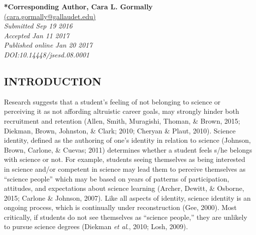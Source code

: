 \documentclass[11.5pt]{sig-alternate} %
\begin{document}
\textbf{*Corresponding Author, Cara L. Gormally}\\
\href{mailto: cara.gormally@gallaudet.edu }{(cara.gormally@gallaudet.edu)} \\
\textit{Submitted Sep 19 2016 }\\
\textit{Accepted Jan 11 2017} \\
\textit{Published online Jan 20 2017} \\
\textit{DOI:10.14448/jsesd.08.0001} \\
\pagebreak
\clearpage
\begin{large}
\section*{INTRODUCTION}

Research suggests that a student’s feeling of not belonging to science or perceiving it as not affording altruistic career goals, may strongly hinder both recruitment and retention (Allen, Smith, Muragishi, Thoman, \& Brown, 2015; Diekman, Brown, Johnston, \& Clark; 2010; Cheryan \& Plaut, 2010). Science identity, defined as the authoring of one’s identity in relation to science (Johnson, Brown, Carlone, \& Cuevas; 2011) determines whether a student feels s/he belongs with science or not. For example, students seeing themselves as being interested in science and/or competent in science may lead them to perceive themselves as “science people” which may be based on years of patterns of participation, attitudes, and expectations about science learning (Archer, Dewitt, \& Osborne, 2015; Carlone \& Johnson, 2007). Like all aspects of identity, science identity is an ongoing process, which is continually under reconstruction (Gee, 2000). Most critically, if students do not see themselves as “science people,” they are unlikely to pursue science degrees (Diekman \textit{et al}., 2010; Losh, 2009). 


\end{large}
\end{document}
